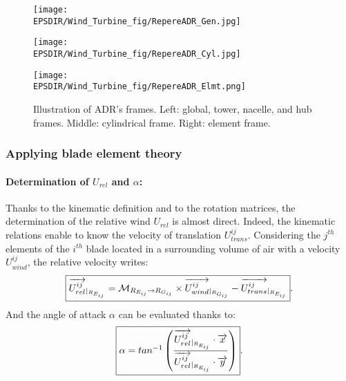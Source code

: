 \begin{figure}
    \centering
    \begin{minipage}{0.32\textwidth}
        \centering
        \texttt{[image: \\EPSDIR/Wind\_Turbine\_fig/RepereADR\_Gen.jpg]}
        \label{fig:a}
    \end{minipage}
    \hfill
    \begin{minipage}{0.32\textwidth}
        \centering
        \texttt{[image: \\EPSDIR/Wind\_Turbine\_fig/RepereADR\_Cyl.jpg]}
        \label{fig:b}
    \end{minipage}
    \hfill
    \begin{minipage}{0.32\textwidth}
        \centering
        \texttt{[image: \\EPSDIR/Wind\_Turbine\_fig/RepereADR\_Elmt.png]}
        \label{fig:c}
    \end{minipage}
    \caption{Illustration of ADR's frames. Left: global, tower, nacelle, and hub frames. Middle: cylindrical frame. Right: element frame.}
    \label{fig:ADR_frames}
\end{figure}

\subsubsection*{Applying blade element theory}

\paragraph*{Determination of $U_{rel}$ and $\alpha$:}
Thanks to the kinematic definition and to the rotation matrices, the determination of the relative wind $U_{rel}$ is almost direct. Indeed, the kinematic relations enable to know the velocity of translation $U^{ij}_{trans}$. Considering the $j^{th}$ elements of the $i^{th}$ blade located in a surrounding volume of air with a velocity $U^{ij}_{wind}$, the relative velocity writes:
\begin{equation}
\label{eq:ADR_urel}
\fbox{$
\overrightarrow{U^{ij}_{rel}}_{\vert _{R_{E_{ij}}}} = \mathcal{M}_{R_{E_{ij}} \rightarrow R_{G_{ij}}} \times \overrightarrow{U^{ij}_{wind}}_{\vert _{R_{G_{ij}}}} - \overrightarrow{U^{ij}_{trans}}_{\vert _{R_{E_{ij}}}}
$}.
\end{equation}
And the angle of attack $\alpha$ can be evaluated thanks to:
\begin{equation}
\label{eq:ADR_alpha}
\fbox{$
\alpha = tan^{-1} \left( \dfrac{\overrightarrow{U^{ij}_{rel}}_{\vert _{R_{E_{ij}}}} \cdot \overrightarrow{x}}{\overrightarrow{U^{ij}_{rel}}_{\vert _{R_{E_{ij}}}} \cdot \overrightarrow{y}} \right)
$}.
\end{equation}

